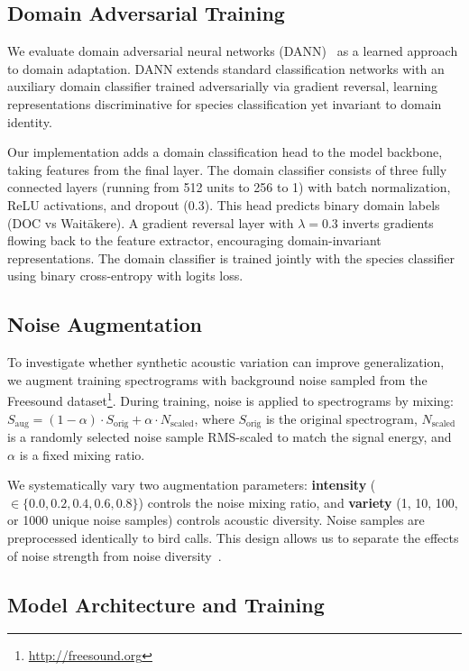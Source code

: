 \documentclass[peer-review]{fa2026}
\begin{document}
\subsection{Domain Adversarial Training}

We evaluate domain adversarial neural networks (DANN)~\cite{ganin2016domain} as a learned approach to domain adaptation. DANN extends standard classification networks with an auxiliary domain classifier trained adversarially via gradient reversal, learning representations discriminative for species classification yet invariant to domain identity.

Our implementation adds a domain classification head to the model backbone, taking features from the final layer. The domain classifier consists of three fully connected layers (running from 512 units to 256 to 1) with batch normalization, ReLU activations, and dropout (0.3). This head predicts binary domain labels (DOC vs Wait\=akere). A gradient reversal layer with $\lambda=0.3$ inverts gradients flowing back to the feature extractor, encouraging domain-invariant representations. The domain classifier is trained jointly with the species classifier using binary cross-entropy with logits loss.

\subsection{Noise Augmentation}

To investigate whether synthetic acoustic variation can improve generalization, we augment training spectrograms with background noise sampled from the Freesound dataset\footnote{\url{http://freesound.org}}. During training, noise is applied to spectrograms by mixing: $S_{\text{aug}} = (1-\alpha) \cdot S_{\text{orig}} + \alpha \cdot N_{\text{scaled}}$, where $S_{\text{orig}}$ is the original spectrogram, $N_{\text{scaled}}$ is a randomly selected noise sample RMS-scaled to match the signal energy, and $\alpha$ is a fixed mixing ratio.

We systematically vary two augmentation parameters: \textbf{intensity} ($\in \{0.0, 0.2, 0.4, 0.6, 0.8\}$) controls the noise mixing ratio, and \textbf{variety} (1, 10, 100, or 1000 unique noise samples) controls acoustic diversity. Noise samples are preprocessed identically to bird calls. This design allows us to separate the effects of noise strength from noise diversity~\cite{kumar2024}.

\subsection{Model Architecture and Training}
\end{document}
